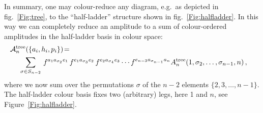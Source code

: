 \ee
In summary, one may colour-reduce any diagram, e.g.\ as depicted in fig.~\ref{Fig:tree},
to the ``half-ladder'' structure shown in fig.~\ref{Fig:halfladder}.
In this way we can completely reduce an amplitude to a sum of colour-ordered amplitudes
in the half-ladder basis in colour space:
%
\begin{align}
\label{DDM}
\begin{split}
\cA_{n}^{\text{tree}}(\{ a_{i}, h_{i},p_{i}\}) %
\!=\!  \\
\sum_{\sigma\in S_{n-2}}\, 
f^{a_{1}a_{\sigma_{2}}e_{1}} & \, f^{e_{1}a_{\sigma_{3}}e_{2}} \, f^{e_{2}a_{\sigma_{4}}e_{3}} 
\cdots f^{e_{n-3}a_{\sigma_{n-1}}a_{n}} 
A_{n}^{\text{tree}}(1, {\sigma_{2}}, 
\ldots , {\sigma_{n-1}}, n) \, , 
\end{split}
\end{align}
where we now sum over the permutations $\sigma$ of the $n{-}2$ elements $\{2,3,\ldots, n-1\}$.
The half-ladder colour basis fixes two (arbitrary) legs, here 1 and  $n$, see Figure~\ref{Fig:halfladder}.

